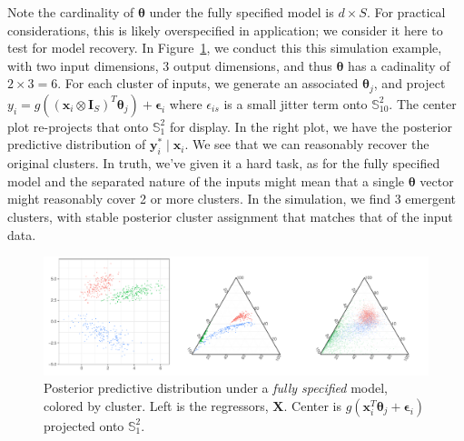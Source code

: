     Note the cardinality of $\bm{\theta}$ under the fully specified model is $d\times S$.  For practical
    considerations, this is likely overspecified in application; we consider it here to test
    for model recovery.  In Figure~\ref{fig:simreg}, we conduct this this simulation example, with two
    input dimensions, 3 output dimensions, and thus $\bm{\theta}$ has a cadinality of $2\times 3 = 6$.
    For each cluster of inputs, we generate an associated $\bm{\theta}_j$, and project 
    $y_i = g\left((\bm{x}_i\otimes\bm{I}_S)^T\bm{\theta}_j\right) + \bm{\epsilon}_i$ where 
    $\epsilon_{is}$ is a small jitter term onto 
    $\mathbb{S}_{10}^{2}$.  The center plot re-projects that onto $\mathbb{S}_1^{2}$ for display.
    In the right plot, we have the posterior predictive distribution of $\bm{y}_i^{*}\mid \bm{x}_i$.
    We see that we can reasonably recover the original clusters.  In truth, we've given it a hard
    task, as for the fully specified model and the separated nature of the inputs might mean that 
    a single $\bm{\theta}$ vector might reasonably cover 2 or more clusters.  In the simulation,
    we find 3 emergent clusters, with stable posterior cluster assignment that matches that of the 
    input data.

\begin{figure}[t]
    \centering
    \caption{Posterior predictive distribution under a \emph{fully specified} model, colored 
        by cluster.  Left is the regressors, $\bm{X}$.  Center is 
        $g(\bm{x}_i^T\bm{\theta}_j + \bm{\epsilon}_i)$ projected onto $\mathbb{S}_1^2$.
        \label{fig:simreg}}
    \includegraphics[width = \textwidth]{plots/simulated_reg}
\end{figure}

